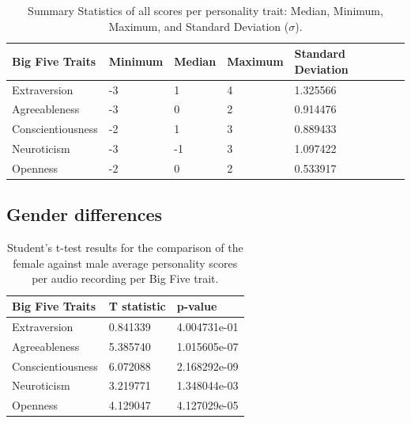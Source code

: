 \documentclass{l4proj}
\begin{document}
    
\begin{table}[h]
    \centering
    \begin{tabular}{lllll}
        \textbf{Big Five Traits} & \textbf{Minimum}           & \textbf{Median}            & \textbf{Maximum}          & \textbf{Standard Deviation} \\ \hline
        Extraversion             & -3                         & 1                          & 4                         & 1.325566                    \\
        Agreeableness            & -3                         & 0                          & 2                         & 0.914476                    \\
        Conscientiousness        & -2                         & 1                          & 3                         & 0.889433                    \\
        Neuroticism              & -3                         & -1                         & 3                          & 1.097422                    \\
        Openness                 & -2                         & 0                          & 2                         & 0.533917                    \\
    \end{tabular}
    \vspace{10pt}
    \caption{Summary Statistics of all scores per personality trait: Median, Minimum, Maximum, and Standard Deviation ($\sigma$).}
    \label{table:Pitch_Gender_values}
\end{table}

\subsection{Gender differences}\label{sec:Results_gender_differences}

\begin{table}[h]
\centering
{}
\begin{tabular}{lll}
\textbf{Big Five Traits} & \textbf{T statistic} & \textbf{p-value} \\ \hline%
Extraversion             & 0.841339             & 4.004731e-01     \\
Agreeableness            & 5.385740             & 1.015605e-07     \\
Conscientiousness        & 6.072088             & 2.168292e-09     \\
Neuroticism              & 3.219771             & 1.348044e-03     \\
Openness                 & 4.129047             & 4.127029e-05     \\ 
\end{tabular}
\vspace{10pt}
\caption{Student's t-test results for the comparison of the female against male average personality scores per audio recording per Big Five trait.}
\label{table:StatAnalysis_ttest}
\end{table}
\end{document}
